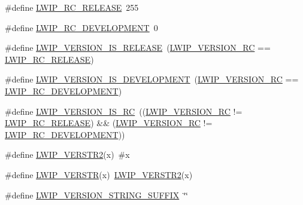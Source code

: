 \begin{DoxyCompactItemize}
\item 
\#define \hyperlink{group__lwip__version_ga375ee868e76ed7c458cdf249387bd469}{L\+W\+I\+P\+\_\+\+R\+C\+\_\+\+R\+E\+L\+E\+A\+SE}~255
\item 
\#define \hyperlink{group__lwip__version_ga9ca69b1a453eb72efd0bbda333f2a33b}{L\+W\+I\+P\+\_\+\+R\+C\+\_\+\+D\+E\+V\+E\+L\+O\+P\+M\+E\+NT}~0
\item 
\#define \hyperlink{group__lwip__version_gabba875b6b4e4ca2dce972f4beec4b726}{L\+W\+I\+P\+\_\+\+V\+E\+R\+S\+I\+O\+N\+\_\+\+I\+S\+\_\+\+R\+E\+L\+E\+A\+SE}~(\hyperlink{group__lwip__version_gac1dc92d8f453a98560de7e2e00a221a1}{L\+W\+I\+P\+\_\+\+V\+E\+R\+S\+I\+O\+N\+\_\+\+RC} == \hyperlink{group__lwip__version_ga375ee868e76ed7c458cdf249387bd469}{L\+W\+I\+P\+\_\+\+R\+C\+\_\+\+R\+E\+L\+E\+A\+SE})
\item 
\#define \hyperlink{group__lwip__version_ga5ccfb66bcbcf642a64f369ebefa2ad53}{L\+W\+I\+P\+\_\+\+V\+E\+R\+S\+I\+O\+N\+\_\+\+I\+S\+\_\+\+D\+E\+V\+E\+L\+O\+P\+M\+E\+NT}~(\hyperlink{group__lwip__version_gac1dc92d8f453a98560de7e2e00a221a1}{L\+W\+I\+P\+\_\+\+V\+E\+R\+S\+I\+O\+N\+\_\+\+RC} == \hyperlink{group__lwip__version_ga9ca69b1a453eb72efd0bbda333f2a33b}{L\+W\+I\+P\+\_\+\+R\+C\+\_\+\+D\+E\+V\+E\+L\+O\+P\+M\+E\+NT})
\item 
\#define \hyperlink{group__lwip__version_ga286a5221bb18242db9071479d8125b38}{L\+W\+I\+P\+\_\+\+V\+E\+R\+S\+I\+O\+N\+\_\+\+I\+S\+\_\+\+RC}~((\hyperlink{group__lwip__version_gac1dc92d8f453a98560de7e2e00a221a1}{L\+W\+I\+P\+\_\+\+V\+E\+R\+S\+I\+O\+N\+\_\+\+RC} != \hyperlink{group__lwip__version_ga375ee868e76ed7c458cdf249387bd469}{L\+W\+I\+P\+\_\+\+R\+C\+\_\+\+R\+E\+L\+E\+A\+SE}) \&\& (\hyperlink{group__lwip__version_gac1dc92d8f453a98560de7e2e00a221a1}{L\+W\+I\+P\+\_\+\+V\+E\+R\+S\+I\+O\+N\+\_\+\+RC} != \hyperlink{group__lwip__version_ga9ca69b1a453eb72efd0bbda333f2a33b}{L\+W\+I\+P\+\_\+\+R\+C\+\_\+\+D\+E\+V\+E\+L\+O\+P\+M\+E\+NT}))
\item 
\#define \hyperlink{group__lwip__version_gaf32777134eea478cc10bada0629a9e7e}{L\+W\+I\+P\+\_\+\+V\+E\+R\+S\+T\+R2}(x)~\#x
\item 
\#define \hyperlink{group__lwip__version_ga6dcc57b1d685cae569b2c9c9461de0e2}{L\+W\+I\+P\+\_\+\+V\+E\+R\+S\+TR}(x)~\hyperlink{group__lwip__version_gaf32777134eea478cc10bada0629a9e7e}{L\+W\+I\+P\+\_\+\+V\+E\+R\+S\+T\+R2}(x)
\item 
\#define \hyperlink{group__lwip__version_ga548fd1ff32bddf18074d284b794a3983}{L\+W\+I\+P\+\_\+\+V\+E\+R\+S\+I\+O\+N\+\_\+\+S\+T\+R\+I\+N\+G\+\_\+\+S\+U\+F\+F\+IX}~\char`\"{}\char`\"{}

\end{DoxyCompactItemize}
